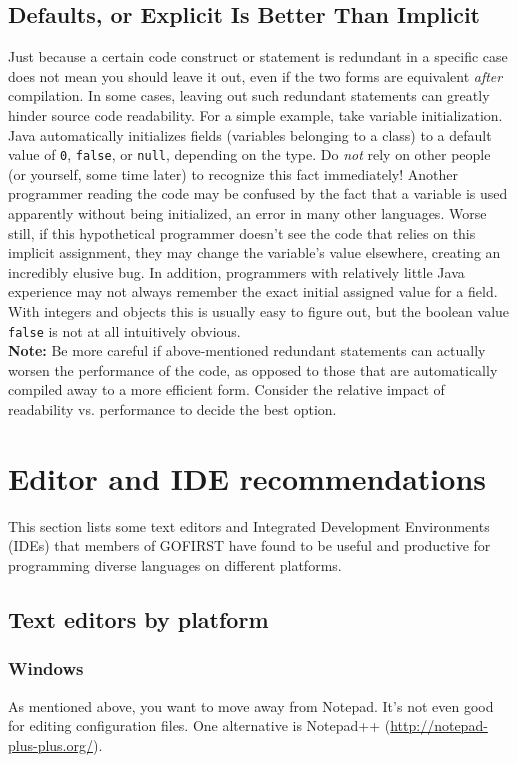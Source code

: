 \documentclass[12pt]{article}
\newcommand{\code}[1]{\texttt{#1}}
\begin{document}
\subsection{Defaults, or Explicit Is Better Than Implicit} Just because a certain code construct or statement is redundant in a specific case does not mean you should leave it out, even if the two forms are equivalent \emph{after} compilation. In some cases, leaving out such redundant statements can greatly hinder source code readability. For a simple example, take variable initialization. Java automatically initializes fields (variables belonging to a class) to a default value of \code{0}, \code{false}, or \code{null}, depending on the type. Do \emph{not} rely on other people (or yourself, some time later) to recognize this fact immediately! Another programmer reading the code may be confused by the fact that a variable is used apparently without being initialized, an error in many other languages. Worse still, if this hypothetical programmer doesn't see the code that relies on this implicit assignment, they may change the variable's value elsewhere, creating an incredibly elusive bug. In addition, programmers with relatively little Java experience may not always remember the exact initial assigned value for a field. With integers and objects this is usually easy to figure out, but the boolean value \code{false} is not at all intuitively obvious.\\
\textbf{Note:} Be more careful if above-mentioned redundant statements can actually worsen the performance of the code, as opposed to those that are automatically compiled away to a more efficient form. Consider the relative impact of readability vs. performance to decide the best option.

\appendix
\section{Editor and IDE recommendations}
\label{sec:editors}
This section lists some text editors and Integrated Development Environments (IDEs) that members of GOFIRST have found to be useful and productive for programming diverse languages on different platforms.

\subsection{Text editors by platform}
\subsubsection{Windows}
As mentioned above, you want to move away from Notepad. It's not even good for editing configuration files. One alternative is Notepad++ (\url{http://notepad-plus-plus.org/}).
\end{document}
